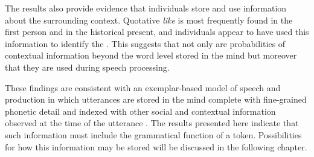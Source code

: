 The results also provide evidence that individuals store and use information about the surrounding context. Quotative \textit{like} is most frequently found in the first person and in the historical present, and individuals appear to have used this information to identify the . This suggests that not only are probabilities of contextual information beyond the word level stored in the mind but moreover that they are used during speech processing. 



These findings are consistent with an exemplar-based model of speech  and production in which utterances are stored in the mind complete with fine-grained phonetic detail and indexed with other social and contextual information observed at the time of the utterance \citep{johnson1997,pierrehumbert2001,pierrehumbert2002}. The results presented here indicate that such information must include the grammatical function of a token. Possibilities for how this information may be stored will be discussed in the following chapter.





\newpage
\thispagestyle{empty}
\mbox{}